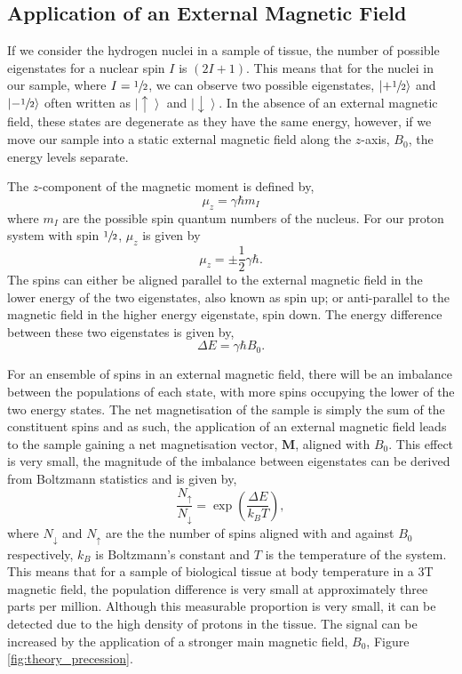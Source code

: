 \subsection{Application of an External Magnetic Field}
If we consider the hydrogen nuclei in a sample of tissue, the number of possible eigenstates for a nuclear spin $I$ is $\left(2I + 1\right)$. This means that for the  nuclei in our sample, where $I=\sfrac{1}{2}$, we can observe two possible eigenstates, $\left| + \sfrac{1}{2} \right \rangle$ and $\left| - \sfrac{1}{2} \right \rangle$ often written as $\left|  \uparrow \right \rangle$ and $\left|  \downarrow \right \rangle$. In the absence of an external magnetic field, these states are degenerate as they have the same energy, however, if we move our sample into a static external magnetic field along the $z$-axis, $B_0$, the energy levels separate.

The $z$-component of the magnetic moment is defined by,
\begin{equation}
\mu_z=\gamma \hbar m_I
\label{eq:theory_longitudinal_magnetic_moment}
\end{equation}
where $m_I$ are the possible spin quantum numbers of the nucleus. For our proton system with spin $\sfrac{1}{2}$, $\mu_z$ is given by
\begin{equation}
\mu_z = \pm \frac{1}{2}\gamma\hbar.
\end{equation}
The spins can either be aligned parallel to the external magnetic field in the lower energy of the two eigenstates, also known as spin up; or anti-parallel to the magnetic field in the higher energy eigenstate, spin down. The energy difference between these two eigenstates is given by,
\begin{equation}
\Delta E = \gamma \hbar B_0.
\label{eq:theory_zeeman}
\end{equation}

For an ensemble of spins in an external magnetic field, there will be an imbalance between the populations of each state, with more spins occupying the lower of the two energy states. The net magnetisation of the sample is simply the sum of the constituent spins and as such, the application of an external magnetic field leads to the sample gaining a net magnetisation vector, $\mathbf{M}$, aligned with $B_0$. This effect is very small, the magnitude of the imbalance between eigenstates can be derived from Boltzmann statistics and is given by,
\begin{equation}
\frac{N_{\uparrow}}{N_{\downarrow}} = \exp \left(\frac{\Delta E}{k_B T}\right),
\label{eq:theory_boltzman}
\end{equation}
where $N_{\downarrow}$ and $N_{\uparrow}$ are the the number of spins aligned with and against $B_0$ respectively, $k_B$ is Boltzmann's constant and $T$ is the temperature of the system. This means that for a sample of biological tissue at body temperature in a 3T magnetic field, the population difference is very small at approximately three parts per million. Although this measurable proportion is very small, it can be detected due to the high density of protons in the tissue. The signal can be increased by the application of a stronger main magnetic field, $B_0$, Figure \ref{fig:theory_precession}.

